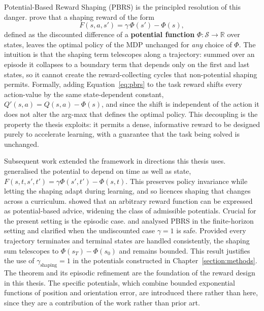 Potential-Based Reward Shaping (PBRS) is the principled resolution of this
danger. \cite{Ng1999PolicyInvariance} prove that a shaping reward of the form
\begin{equation}
    F(s, a, s') = \gamma\, \Phi(s') - \Phi(s),
    \label{eq:pbrs}
\end{equation}
defined as the discounted difference of a \textbf{potential function}
$\Phi: \mathcal{S} \to \mathbb{R}$ over states, leaves the optimal policy of the
MDP unchanged for \emph{any} choice of $\Phi$. The intuition is that the shaping
term telescopes along a trajectory: summed over an episode it collapses to a
boundary term that depends only on the first and last states, so it cannot create
the reward-collecting cycles that non-potential shaping permits. Formally, adding
Equation~\ref{eq:pbrs} to the task reward shifts every action-value by the same
state-dependent constant, $Q'(s, a) = Q(s, a) - \Phi(s)$, and since the shift is
independent of the action it does not alter the arg-max that defines the optimal
policy. This decoupling is the property the thesis exploits: it permits a dense,
informative reward to be designed purely to accelerate learning, with a guarantee
that the task being solved is unchanged.

Subsequent work extended the framework in directions this thesis uses.
\cite{Devlin2012DynamicPBRS} generalised the potential to depend on time as well
as state, $F(s, t, s', t') = \gamma \Phi(s', t') - \Phi(s, t)$. This preserves
policy invariance while letting the shaping adapt during learning, and so licences
shaping that changes across a curriculum. \cite{Harutyunyan2015} showed that an
arbitrary reward function can be expressed as potential-based advice, widening the
class of admissible potentials. Crucial for the present setting is the episodic
case. \cite{GrzesKudenko2009} and \cite{Grzes2017RewardShaping} analysed PBRS in
the finite-horizon setting and clarified when the undiscounted case $\gamma = 1$ is
safe. Provided every trajectory terminates and terminal states are handled
consistently, the shaping sum telescopes to $\Phi(s_T) - \Phi(s_0)$ and remains
bounded. This result justifies the use of $\gamma_{\text{shaping}} = 1$ in the
potentials constructed in Chapter~\ref{section:methods}. The theorem and its
episodic refinement are the foundation of the reward design in this thesis. The
specific potentials, which combine bounded exponential functions of position and
orientation error, are introduced there rather than here, since they are a
contribution of the work rather than prior art.


